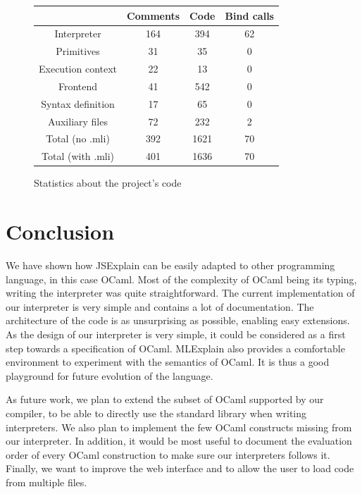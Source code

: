 \documentclass[twocolumn,a4paper]{article} \usepackage[utf8]{inputenc}
\begin{document}
\begin{figure}
  \begin{tabular}{| c | c | c | c |}
    \hline
    & Comments & Code & Bind calls \\
    \hline
    Interpreter & 164 & 394 & 62 \\
    Primitives & 31 & 35 & 0 \\
    Execution context & 22 & 13 & 0 \\
    Frontend & 41 & 542 & 0 \\
    Syntax definition & 17 & 65 & 0 \\
    Auxiliary files & 72 & 232 & 2 \\
    \hline
    Total (no .mli) & 392 & 1621 & 70 \\
    Total (with .mli) & 401 & 1636 & 70 \\
    \hline
  \end{tabular}

  \centering
  \caption{Statistics about the project's code}
  \label{fig:statistics}
\end{figure}

\section{Conclusion}
We have shown how JSExplain can be easily adapted to other programming language,
in this case OCaml. Most of the complexity of OCaml being its typing, writing
the interpreter was quite straightforward. The current implementation of our
interpreter is very simple and contains a lot of documentation. The architecture
of the code is as unsurprising as possible, enabling easy extensions. As the
design of our interpreter is very simple, it could be considered as a first step
towards a specification of OCaml. MLExplain also provides a comfortable
environment to experiment with the semantics of OCaml. It is thus a good
playground for future evolution of the language.

As future work, we plan to extend the subset of OCaml supported by our compiler,
to be able to directly use the standard library when writing interpreters. We
also plan to implement the few OCaml constructs missing from our interpreter. In
addition, it would be most useful to document the evaluation order of every
OCaml construction to make sure our interpreters follows it. Finally, we want to
improve the web interface and to allow the user to load code from multiple
files.



\end{document}
